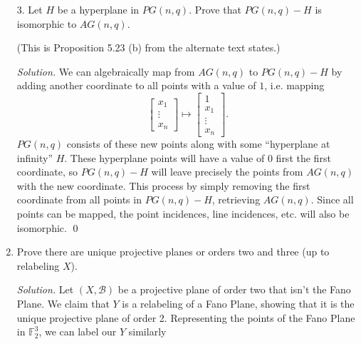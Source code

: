 \documentclass[11pt,letterpaper,dvipsnames]{article}
\newcommand{\qbin}[2]{\begin{bmatrix}{#1}\\ {#2}\end{bmatrix}_q}
\newenvironment{solution}{\color{Violet}\textit{Solution.}}{\color{black}}
\begin{document}
\begin{enumerate}
\begin{solution}
\begin{enumerate}
		Now assume for some $n\in \mathbb{Z}^+$ that for all $k\in\mathbb{Z}^+$, $\qbin{n}{k}$ is a polynomial in $q$. We need to show that $\qbin{n+1}{k}$ is also a polynomial in $q$. But by (a), this is a linear combination of $\qbin{n}{k-1}$ and $\qbin{n}{k}$, which are each polynomials in $q$ by our inductive hypothesis. Thus $\qbin{n+1}{k}$ is also a polynomial in $q$ for all $k\in\mathbb{Z}^+$, and our inductive step is complete. \qed
	\end{enumerate}
\end{solution}

\item[3.] Let $H$ be a hyperplane in $PG(n,q)$.
Prove that $PG(n,q) - H$ is isomorphic to $AG(n,q)$.

(This is Proposition 5.23 (b) from the alternate text states.)

\begin{solution}
	We can algebraically map from $AG(n,q)$ to $PG(n,q)-H$ by adding another coordinate to all points with a value of $1$, i.e. mapping
	\[
		\begin{bmatrix}x_1 \\ \vdots \\ x_n \end{bmatrix} \mapsto \begin{bmatrix}1 \\ x_1 \\ \vdots \\ x_n \end{bmatrix}.
	\]
	$PG(n,q)$ consists of these new points along with some ``hyperplane at infinity'' $H$. These hyperplane points will have a value of $0$ first the first coordinate, so $PG(n,q)-H$ will leave precisely the points from $AG(n,q)$ with the new coordinate. This process by simply removing the first coordinate from all points in $PG(n,q)-H$, retrieving $AG(n,q)$. Since all points can be mapped, the point incidences, line incidences, etc. will also be isomorphic. \qed
\end{solution}

\item Prove there are unique projective planes or orders two and three (up to
relabeling $X$).

\begin{solution}
	Let $(X,\mathcal{B})$ be a projective plane of order two that isn't the Fano Plane. We claim that $Y$ is a relabeling of a Fano Plane, showing that it is the unique projective plane of order 2. Representing the points of the Fano Plane in $\mathbb{F}_2^3$, we can label our $Y$ similarly
\end{solution}

\end{enumerate}
\end{document}
